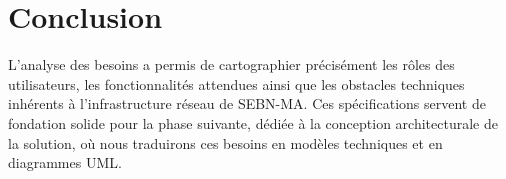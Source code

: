 \section*{Conclusion}
L'analyse des besoins a permis de cartographier précisément les rôles des utilisateurs, les fonctionnalités attendues ainsi que les obstacles techniques inhérents à l'infrastructure réseau de SEBN-MA. Ces spécifications servent de fondation solide pour la phase suivante, dédiée à la conception architecturale de la solution, où nous traduirons ces besoins en modèles techniques et en diagrammes UML.